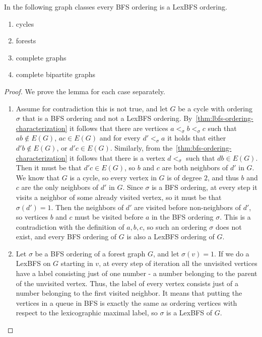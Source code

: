 \documentclass{svproc}
\begin{document}
\begin{lemma}\label{lem:(L)BFS-cycles-forests-cliques}
In the following graph classes every BFS ordering is a LexBFS ordering. 
\begin{enumerate}[nosep, label = \roman*)]
\item cycles
\item forests
\item complete graphs
\item complete bipartite graphs
\end{enumerate}
\end{lemma}
\begin{proof}
We prove the lemma for each case separately.

\begin{enumerate}[nosep, label = \roman*)]
\item Assume for contradiction this is not true, and let $G$ be a cycle with ordering $\sigma$ that is a BFS ordering and not a LexBFS ordering. By~\cref{thm:lbfs-ordering-characterization} it follows that there are vertices $a<_\sigma b<_\sigma c$ such that $ab\notin E(G)$, $ac\in E(G)$ and for every $d'<_\sigma a$ it holds that either $d'b\notin E(G)$, or $d'c\in E(G)$. Similarly, from the~\ref{thm:bfs-ordering-characterization} it follows that there is a vertex $d<_\sigma $ such that $db\in E(G)$. Then it must be that $d'c\in E(G)$, so $b$ and $c$ are both neighbors of $d'$ in $G$. We know that $G$ is a cycle, so every vertex in $G$ is of degree $2$, and thus $b$ and $c$ are the only neighbors of $d'$ in $G$. Since $\sigma$ is a BFS ordering, at every step it visits a neighbor of some already visited vertex, so it must be that $\sigma(d')=1$. Then the neighbors of $d'$ are visited before non-neighbors of $d'$, so vertices $b$ and $c$ must be visited before $a$ in the BFS ordering $\sigma$. This is a contradiction with the definition of $a,b,c$, so such an ordering $\sigma$ does not exist, and every BFS ordering of $G$ is also a LexBFS ordering of $G$.
\item Let $\sigma $ be a BFS ordering of a forest graph $G$, and let $\sigma(v)=1$. If we do a LexBFS on $G$ starting in $v$, at every step of iteration all the unvisited vertices have a label consisting just of one number - a number belonging to the parent of the unvisited vertex. Thus, the label of every vertex consists just of a number belonging to the first visited neighbor. It means that putting the vertices in a queue in BFS is exactly the same as ordering vertices with respect to the lexicographic maximal label, so $\sigma$ is a LexBFS of $G$. 


\end{enumerate}
\end{proof}
\end{document}

